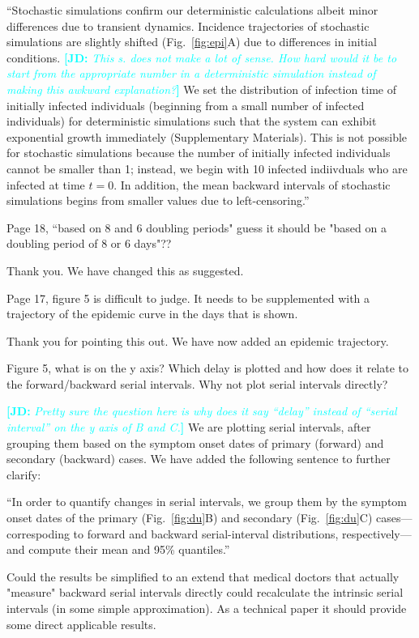 \documentclass[12pt]{article}
\newcommand{\fref}[1]{Fig.~\ref{fig:#1}}
\newcommand{\revtext}{\textsf}
\newcommand{\comment}[3]{\textcolor{#1}{\textbf{[#2: }\textsl{#3}\textbf{]}}}
\newcommand{\jd}[1]{\comment{cyan}{JD}{#1}}
\begin{document}
``Stochastic simulations confirm our deterministic calculations albeit minor differences due to transient dynamics.
Incidence trajectories of stochastic simulations are slightly shifted (\fref{epi}A) due to differences in initial conditions. 
\jd{This s. does not make a lot of sense. How hard would it be to start from the appropriate number in a deterministic simulation instead of making this awkward explanation?}
We set the distribution of infection time of initially infected individuals (beginning from a small number of infected individuals) for deterministic simulations such that the system can exhibit exponential growth immediately (Supplementary Materials).
This is not possible for stochastic simulations because the number of initially infected individuals cannot be smaller than 1; instead, we begin with 10 infected indiivduals who are infected at time $t=0$.
In addition, the mean backward intervals of stochastic simulations begins from smaller values due to left-censoring.''

\revtext{Page 18, ``based on 8 and 6 doubling periods" guess it should be "based on a doubling period of 8 or 6 days"??}

Thank you. We have changed this as suggested.

\revtext{Page 17, figure 5 is difficult to judge. It needs to be supplemented with a trajectory of the epidemic curve in the days that is shown.}

Thank you for pointing this out. We have now added an epidemic trajectory.

\revtext{Figure 5, what is on the y axis? Which delay is plotted and how does it relate to the forward/backward serial intervals. Why not plot serial intervals directly?}

\jd{Pretty sure the question here is why does it say ``delay'' instead of ``serial interval'' on the y axis of B and C.}
We are plotting serial intervals, after grouping them based on the symptom onset dates of primary (forward) and secondary (backward) cases. We have added the following sentence to further clarify:

``In order to quantify changes in serial intervals, we group them by the symptom onset dates of the primary (\fref{du}B) and secondary (\fref{du}C) cases---correspoding to forward and backward serial-interval distributions, respectively---and compute their mean and 95\% quantiles.''

\revtext{Could the results be simplified to an extend that medical doctors that actually "measure" backward serial intervals directly could recalculate the intrinsic serial intervals (in some simple approximation). As a technical paper it should provide some direct applicable results.}
\end{document}
